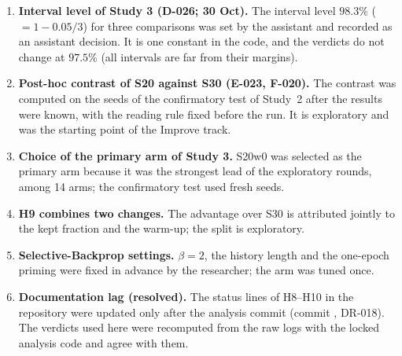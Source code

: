 \begin{enumerate}
\item \textbf{Interval level of Study 3 (D-026; 30 Oct).} The interval level $98.3\%$ ($=1-0.05/3$) for three comparisons was set by the assistant and recorded as an assistant decision. It is one constant in the code, and the verdicts do not change at $97.5\%$ (all intervals are far from their margins).
\item \textbf{Post-hoc contrast of S20 against S30 (E-023, F-020).} The contrast was computed on the seeds of the confirmatory test of Study~2 after the results were known, with the reading rule fixed before the run. It is exploratory and was the starting point of the Improve track.
\item \textbf{Choice of the primary arm of Study 3.} S20w0 was selected as the primary arm because it was the strongest lead of the exploratory rounds, among 14 arms; the confirmatory test used fresh seeds.
\item \textbf{H9 combines two changes.} The advantage over S30 is attributed jointly to the kept fraction and the warm-up; the split is exploratory.
\item \textbf{Selective-Backprop settings.} $\beta=2$, the history length and the one-epoch priming were fixed in advance by the researcher; the arm was tuned once.
\item \textbf{Documentation lag (resolved).} The status lines of H8--H10 in the repository were updated only after the analysis commit \code{\repocommit} (commit , DR-018). The verdicts used here were recomputed from the raw logs with the locked analysis code and agree with them.
\end{enumerate}
